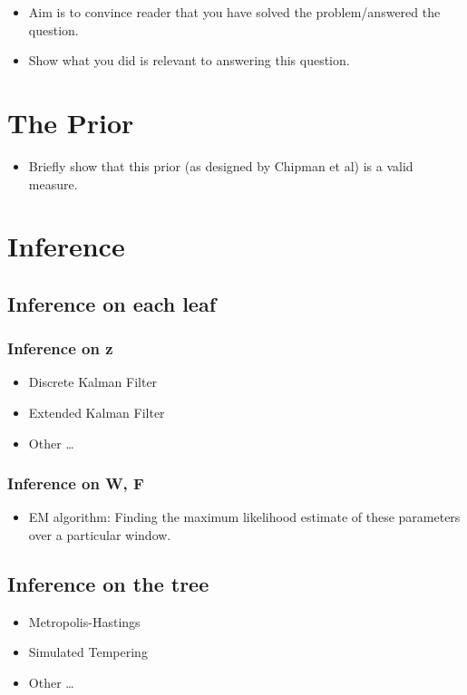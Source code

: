\begin{itemize}
\item Aim is to convince reader that you have solved the problem/answered the question.
\item Show what you did is relevant to answering this question. 
\end{itemize}

\section{The Prior}
\begin{itemize}
\item Briefly show that this prior (as designed by Chipman et al) is a valid measure.
\end{itemize}

\section{Inference}
\subsection{Inference on each leaf}
\subsubsection*{Inference on z}
\begin{itemize}
\item Discrete Kalman Filter
\item Extended Kalman Filter
\item Other \ldots
\end{itemize}
\subsubsection*{Inference on W, F}
\begin{itemize}
\item EM algorithm: Finding the maximum likelihood estimate of these parameters over a particular window. 
\end{itemize}

\subsection{Inference on the tree}
\begin{itemize}
\item Metropolis-Hastings
\item Simulated Tempering
\item Other \ldots
\end{itemize}

